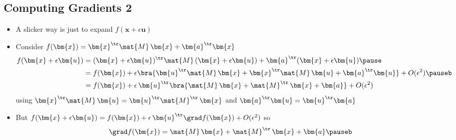 \begin{slide}
\section{Computing Gradients 2}

\begin{PauseHighLight}
  \begin{itemize}
  \item A slicker way is just to expand $f(\bm{x}+ \epsilon
    \bm{u})$\pause
  \item Consider $f(\bm{x}) = \bm{x}^\tr \mat{M}\,\bm{x} +
    \bm{a}^\tr\bm{x}$
    \begin{align*}
      f(\bm{x}+ \epsilon \bm{u}) &= (\bm{x}+ \epsilon \bm{u})^\tr
      \mat{M}\, (\bm{x}+ \epsilon \bm{u})  +    \bm{a}^\tr(\bm{x}+
      \epsilon \bm{u}) \pause\\
      &= f(\bm{x}) + \epsilon\bra{ \bm{u}^\tr\mat{M}\, \bm{x} +
        \bm{x}^\tr\mat{M}\, \bm{u} + \bm{a}^\tr\bm{u}} +O(\epsilon^2)  \pauseb\\
      &= f(\bm{x}) + \epsilon\, \bm{u}^\tr \bra{\mat{M}\, \bm{x}+
        \mat{M}^\tr\, \bm{x} + \bm{a} }+O(\epsilon^2) 
    \end{align*}
    using $\bm{x}^\tr\mat{M}\, \bm{u}  = \bm{u}^\tr\mat{M}^\tr\,
    \bm{x}$ and $\bm{a}^\tr\bm{u} = \bm{u}^\tr\bm{a}$\pauseb
  \item But $
      f(\bm{x}+ \epsilon \bm{u})  = f(\bm{x})  + \epsilon \,
      \bm{u}^\tr \grad f(\bm{x})  + O(\epsilon^2)$ so
    \begin{align*}
      \grad f(\bm{x}) = \mat{M}\, \bm{x}+
        \mat{M}^\tr\, \bm{x} + \bm{a} \pauseb
    \end{align*}
  \end{itemize}
\end{PauseHighLight}

\end{slide}


